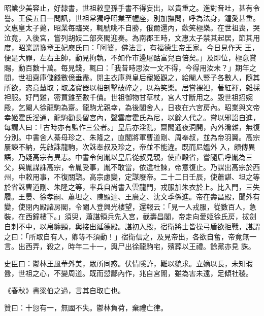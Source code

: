 \begin{pinyinscope}
 昭業少美容止，好隸書，世祖敕皇孫手書不得妄出，以貴重之。進對音吐，甚有令譽。王侯五日一問訊，世祖常獨呼昭業至幄座，別加撫問，呼為法身，鐘愛甚重。文惠皇太子薨，昭業每臨哭，輒號咷不自勝，俄爾還內，歡笑極樂。在世祖喪，哭泣竟，入後宮，嘗列胡妓二部夾閣迎奏。為南郡王時，文惠太子禁其起居，節其用度，昭業謂豫章王妃庾氏曰：「阿婆，佛法言，有福德生帝王家。今日見作天
 王，便是大罪，左右主帥，動見拘執，不如作市邊屠酤富兒百倍矣。」及即位，極意賞賜，動百數十萬。每見錢，輒曰：「我昔時思汝一文不得，今得用汝未？」期年之間，世祖齋庫儲錢數億垂盡。開主衣庫與皇后寵姬觀之，給閹人豎子各數人，隨其所欲，恣意輦取；取諸寶器以相剖擊破碎之，以為笑樂。居嘗裸袒，著紅褌，雜採袒服。好鬥雞，密買雞至數千價。世祖御物甘草杖，宮人寸斷用之。毀世祖招婉殿，乞閹人徐龍駒為齋。龍駒尤親幸，為後閣舍人，日夜在六宮房內。昭業與文帝幸姬霍氏淫通，龍駒勸長留宮內，聲雲度霍氏為尼，以餘人代之。嘗以邪諂自進，每謂人曰：「古時亦有監作三公者。」皇后亦淫亂，齋閣通夜洞開，內外淆雜，無復分別。中書舍人綦母珍之、朱隆之，直閣將軍曹道剛、周奉叔，並為帝羽翼。高宗屢諫不納，先啟誅龍駒，次誅奉叔及珍之，帝並不能違。既而尼媼外
 入，頗傳異語，乃疑高宗有異志。中書令何胤以皇后從叔見親，使直殿省，嘗隨后呼胤為三父，與胤謀誅高宗，令胤受事，胤不敢當，依違杜諫，帝意復止。乃謀出高宗於西州，中敕用事，不復關諮。高宗慮變，定謀廢帝。二十二日壬辰，使蕭諶、坦之等於省誅曹道剛、朱隆之等，率兵自尚書入雲龍門，戎服加朱衣於上。比入門，三失履。王晏、徐孝嗣、蕭坦之、陳顯達、王廣之、沈文季係進。帝在壽昌殿，聞外有變，使閉內殿諸房閣，令閹人登興光樓望，還報云：「見一人戎服，從數百人，急裝，在西鐘樓下。」須臾，蕭諶領兵先入宮，截壽昌閣，帝走向愛姬徐氏房，拔劍自刺不中，以帛纏頸，輿接出延德殿。諶初入殿，宿衛將士皆操弓盾欲拒戰，諶謂之曰：「所取自有人，卿等不須動！」宿衛信之，及見帝出，各欲自奮，帝竟無一言。出西弄，殺之，時年二十一，輿尸出徐龍駒宅，殯葬以王禮。餘黨亦見
 誅。



 史臣曰：鬱林王風華外美，眾所同惑。伏情隱詐，難以貌求。立嫡以長，未知瑕釁，世祖之心，不變周道。既而愆鄙內作，兆自宮闈，雖為害未遠，足傾社稷。



 《春秋》書梁伯之過，言其自取亡也。



 贊曰：十愆有一，無國不失。鬱林負荷，棄禮亡律。



\end{pinyinscope}
